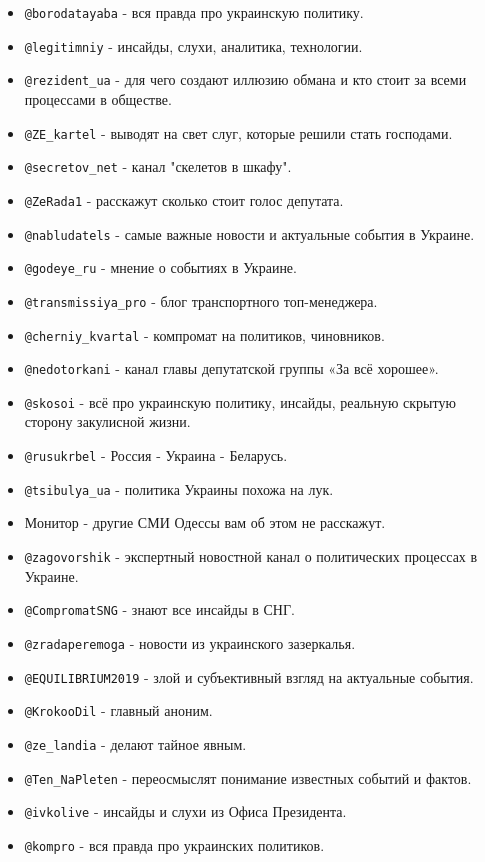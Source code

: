 \begin{itemize}
\item \verb|@borodatayaba| - вся правда про украинскую политику.
\item \verb|@legitimniy| - инсайды, слухи, аналитика, технологии.
\item \verb|@rezident_ua| - для чего создают иллюзию обмана и кто стоит за всеми процессами в обществе.
\item \verb|@ZE_kartel| - выводят на свет слуг, которые решили стать господами.
\item \verb|@secretov_net| - канал "скелетов в шкафу". 
\item \verb|@ZeRada1| - расскажут сколько стоит голос депутата.
\item \verb|@nabludatels| - самые важные новости и актуальные события в Украине.
\item \verb|@godeye_ru| - мнение о событиях в Украине. 
\item \verb|@transmissiya_pro| - блог транспортного топ-менеджера.
\item \verb|@cherniy_kvartal| - компромат на политиков, чиновников.
\item \verb|@nedotorkani| - канал главы депутатской группы «За всё хорошее».
\item \verb|@skosoi| - всё про украинскую политику, инсайды, реальную скрытую сторону закулисной жизни.
\item \verb|@rusukrbel| - Россия - Украина - Беларусь.
\item \verb|@tsibulya_ua| - политика Украины похожа на лук.
\item Монитор - другие СМИ Одессы вам об этом не расскажут.
\item \verb|@zagovorshik| - экспертный новостной канал о политических процессах в Украине.
\item \verb|@CompromatSNG| - знают все инсайды в СНГ.
\item \verb|@zradaperemoga| - новости из украинского зазеркалья. 
\item \verb|@EQUILIBRIUM2019| - злой и субъективный взгляд на актуальные события. 
\item \verb|@KrokooDil| - главный аноним.
\item \verb|@ze_landia| - делают тайное явным.
\item \verb|@Ten_NaPleten| - переосмыслят понимание известных событий и фактов. 
\item \verb|@ivkolive| - инсайды и слухи из Офиса Президента.
\item \verb|@kompro| - вся правда про украинских политиков.

\end{itemize}
